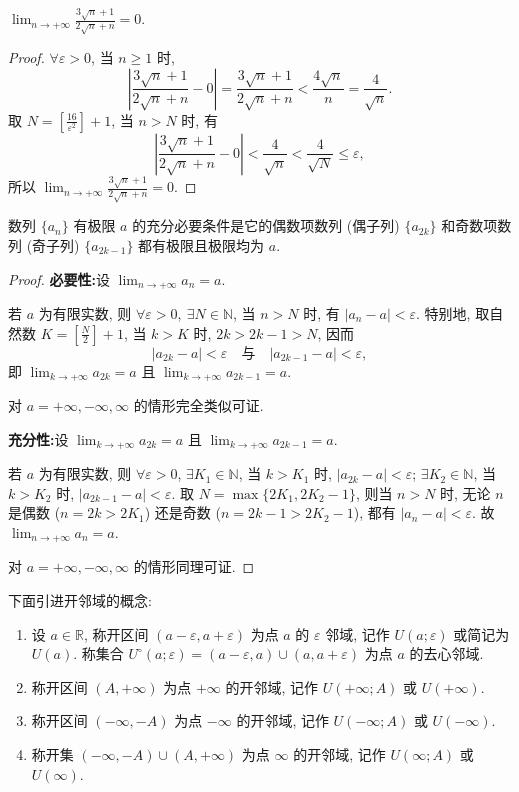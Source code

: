 \begin{example}\label{ex:1.1.11}
$\lim_{n \to +\infty} \frac{3 \sqrt{n} + 1}{2 \sqrt{n} + n} = 0$.
\end{example}
\begin{proof}
$\forall\varepsilon>0$, 当 $n\geqslant 1$ 时,
\[
  \left|\frac{3\sqrt{n}+1}{2\sqrt{n}+n}-0\right| = \frac{3\sqrt{n}+1}{2\sqrt{n}+n} < \frac{4\sqrt{n}}{n} = \frac{4}{\sqrt{n}}.
\]
取 $N = \left[\frac{16}{\varepsilon^2}\right]+1$, 当 $n>N$ 时, 有
\[
  \left|\frac{3\sqrt{n}+1}{2\sqrt{n}+n}-0\right| < \frac{4}{\sqrt{n}} < \frac{4}{\sqrt{N}} \leqslant \varepsilon,
\]
所以 $\lim_{n\to+\infty}\frac{3\sqrt{n}+1}{2\sqrt{n}+n}=0$.
\end{proof}

\begin{theorem}\label{thm:1.1.1}
数列 $\{a_{n}\}$ 有极限 $a$ 的充分必要条件是它的偶数项数列 (偶子列) $\{a_{2k}\}$ 和奇数项数列 (奇子列) $\{a_{2k-1}\}$ 都有极限且极限均为 $a$.
\end{theorem}
\begin{proof}
\textbf{必要性:}\quad 设 $\lim_{n\to+\infty}a_n=a$.

若 $a$ 为有限实数, 则 $\forall\varepsilon>0,\ \exists N\in\mathbb{N}$, 当 $n>N$ 时, 有 $|a_n-a|<\varepsilon$. 特别地, 取自然数 $K = \left[\frac{N}{2}\right]+1$, 当 $k>K$ 时, $2k>2k-1>N$, 因而
\[
  |a_{2k}-a|<\varepsilon\quad \text{与}\quad |a_{2k-1}-a|<\varepsilon,
\]
即 $\lim_{k\to+\infty}a_{2k}=a$ 且 $\lim_{k\to+\infty}a_{2k-1}=a$.

对 $a=+\infty, -\infty, \infty$ 的情形完全类似可证.

\textbf{充分性:}\quad 设 $\lim_{k\to+\infty}a_{2k}=a$ 且 $\lim_{k\to+\infty}a_{2k-1}=a$.

若 $a$ 为有限实数, 则 $\forall\varepsilon>0$, $\exists K_1\in\mathbb{N}$, 当 $k>K_1$ 时, $|a_{2k}-a|<\varepsilon$; $\exists K_2\in\mathbb{N}$, 当 $k>K_2$ 时, $|a_{2k-1}-a|<\varepsilon$. 取 $N = \max\{2K_1, 2K_2-1\}$, 则当 $n>N$ 时, 无论 $n$ 是偶数 ($n=2k>2K_1$) 还是奇数 ($n=2k-1>2K_2-1$), 都有 $|a_n-a|<\varepsilon$. 故 $\lim_{n\to+\infty}a_n=a$.

对 $a=+\infty, -\infty, \infty$ 的情形同理可证.
\end{proof}

下面引进开邻域的概念:
\begin{enumerate}
  \item 设 $a\in\mathbb{R}$, 称开区间 $(a-\varepsilon, a+\varepsilon)$ 为点 $a$ 的 $\varepsilon$ 邻域, 记作 $U(a;\varepsilon)$ 或简记为 $U(a)$. 称集合 $U^\circ(a;\varepsilon) = (a-\varepsilon, a)\cup(a, a+\varepsilon)$ 为点 $a$ 的去心邻域.
  \item 称开区间 $(A, +\infty)$ 为点 $+\infty$ 的开邻域, 记作 $U(+\infty; A)$ 或 $U(+\infty)$.
  \item 称开区间 $(-\infty, -A)$ 为点 $-\infty$ 的开邻域, 记作 $U(-\infty; A)$ 或 $U(-\infty)$.
  \item 称开集 $(-\infty, -A)\cup(A, +\infty)$ 为点 $\infty$ 的开邻域, 记作 $U(\infty; A)$ 或 $U(\infty)$.
\end{enumerate}

